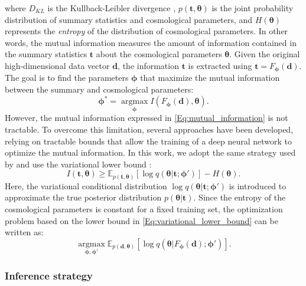 \documentclass{aa}
\begin{document}
where $D_{KL}$ is the Kullback-Leibler divergence \citep{kullback1951information}, $p(\bm {t}, \bm {\theta})$ is the joint probability distribution of summary statistics and cosmological parameters, and $H(\bm {\theta})$ represents the \textit{entropy} of the distribution of cosmological parameters.  
In other words, the mutual information measures the amount of information contained in the summary statistics $\bm t$ about the cosmological parameters $\bm \theta$.
Given the original high-dimensional data vector $\bm d$, the information $\bm t$ is extracted using $\bm {t}=F_{\bm {\phi}}(\bm {d})$. 
The goal is to find the parameters $\bm {\phi}$ that maximize the mutual information between the summary and cosmological parameters:
\begin{equation}
   \bm {\phi}^*= \operatorname*{argmax}_{\bm {\phi}} I(F_{\bm {\phi}}(\bm{d}), \bm {\theta}).
\end{equation}
However, the mutual information expressed in \autoref{Eq:mutual_information} is not tractable. To overcome this limitation,  several approaches have been developed, relying on tractable bounds that allow the training of a deep neural network to optimize the mutual information. In this work, we adopt the same strategy used by \citet{jeffrey2021likelihood} and use the variational lower bound \citep{barber2003information}:
\begin{equation}\label{Eq:variational_lower_bound}
    I(\bm{t}, \bm{\theta}) \ge \mathbb{E}_{p(\bm {t}, \bm {\theta})} [\log{q(\bm {\theta} |\bm{t} ; \bm{\phi}')}]- H(\bm {\theta}).
\end{equation}
Here, the variational conditional distribution $\log{q(\bm {\theta} |\bm{t} ; \bm{\phi}')}$ is introduced to approximate the true posterior distribution $p(\bm{\theta}|\bm {t})$. 
Since the entropy of the cosmological parameters is constant for a fixed training set, the optimization problem based on the lower bound in  \autoref{Eq:variational_lower_bound} can be written as:
\begin{equation}
    \operatorname*{argmax}_{\bm {\phi}, \bm {\phi}'}\mathbb{E}_{p(\bm {d}, \bm {\theta})} [\log{q(\bm {\theta} |F_{\bm {\phi}}(\bm {d}) ; \bm{\phi}')}].
\end{equation}

\subsubsection{Inference strategy}
\end{document}
